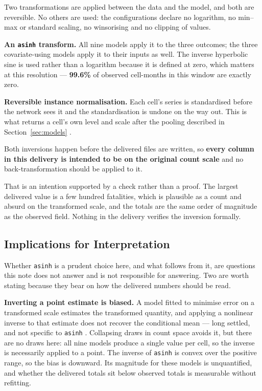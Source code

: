 Two transformations are applied between the data and the model, and both are reversible. No others
are used: the configurations declare no logarithm, no min--max or standard scaling, no winsorising
and no clipping of values.

\textbf{An \texttt{asinh} transform.} All nine models apply it to the three outcomes; the three
covariate-using models apply it to their inputs as well. The inverse hyperbolic sine is used rather
than a logarithm because it is defined at zero, which matters at this resolution --- \textbf{99.6\%}
of observed cell-months in this window are exactly zero.

\textbf{Reversible instance normalisation.} Each cell's series is standardised before the network
sees it and the standardisation is undone on the way out. This is what returns a cell's own level
and scale after the pooling described in Section~\ref{sec:models} \citep{kim2022revin}.

\noindent Both inversions happen before the delivered files are written, so \textbf{every column
in this delivery is intended to be on the original count scale} and no back-transformation should
be applied to it.

That is an intention supported by a check rather than a proof. The largest delivered value is a few
hundred fatalities, which is plausible as a count and absurd on the transformed scale, and the
totals are the same order of magnitude as the observed field. Nothing in the delivery verifies the
inversion formally.

\subsection*{Implications for Interpretation}

Whether \texttt{asinh} is a prudent choice here, and what follows from it, are questions this note
does not answer and is not responsible for answering. Two are worth stating because they bear on
how the delivered numbers should be read.

\textbf{Inverting a point estimate is biased.} A model fitted to minimise error on a transformed
scale estimates the transformed quantity, and applying a nonlinear inverse to that estimate does
not recover the conditional mean --- long settled, and not specific to \texttt{asinh} \citep{duan1983smearing}.
Collapsing draws in count space avoids it, but there are no draws here: all nine models produce a
single value per cell, so the inverse is necessarily applied to a point. The inverse of
\texttt{asinh} is convex over the positive range, so the bias is downward. Its magnitude for these
models is unquantified, and whether the delivered totals sit below observed totals is measurable
without refitting.

